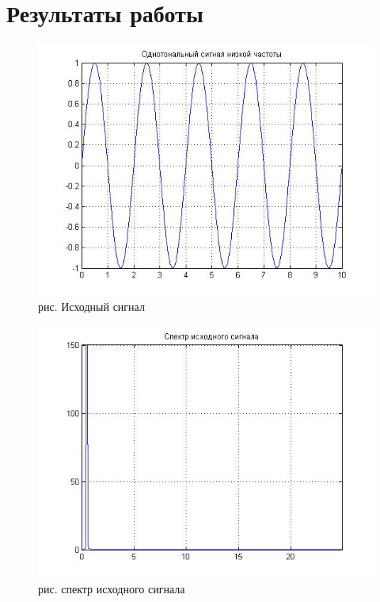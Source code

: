 \documentclass[10pt,a4paper]{report}
\begin{document}
\section{Результаты работы}
\begin{figure}
\begin{center}
\includegraphics[angle=0, scale = 0.9]{7_1.jpg}\newline
рис. Исходный сигнал\newline
\end{center}
\end{figure}
\begin{figure}
\begin{center}
\includegraphics[angle=0, scale = 0.9]{7_2.jpg}\newline
рис. спектр исходного сигнала\newline
\end{center}
\end{figure}
\end{document}
